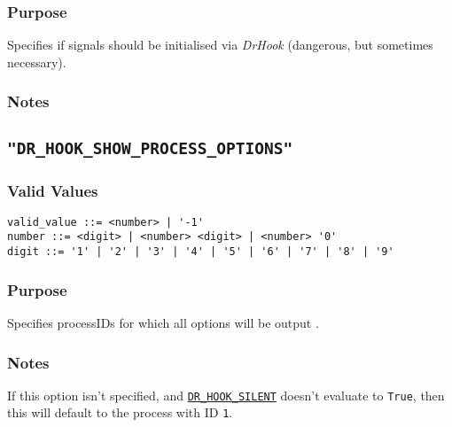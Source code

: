 \vspace{-2ex}
\subsubsection{Purpose}
\vspace{-2ex}
Specifies if signals should be initialised via \textit{DrHook} (dangerous, but sometimes necessary).

\vspace{-2ex}
\subsubsection{Notes}
\vspace{-2ex}



\subsection{\texttt{"DR\_HOOK\_SHOW\_PROCESS\_OPTIONS"}}
\label{section:flags:DR_HOOK_SHOW_PROCESS_OPTIONS}
\vspace{-2ex}
\subsubsection{Valid Values}
\vspace{-2ex}
\verb+valid_value ::= <number> | '-1'+ \\
\verb+number ::= <digit> | <number> <digit> | <number> '0'+ \\
\verb+digit ::= '1' | '2' | '3' | '4' | '5' | '6' | '7' | '8' | '9'+

\vspace{-2ex}
\subsubsection{Purpose}
\vspace{-2ex}
Specifies processIDs for which all options will be output .

\vspace{-2ex}
\subsubsection{Notes}
\vspace{-2ex}
If this option isn't specified, and \hyperref[section:flags:DR_HOOK_SILENT]{\texttt{DR\_HOOK\_SILENT}} doesn't evaluate to \verb|True|, then this will default to the process with ID \verb|1|.

